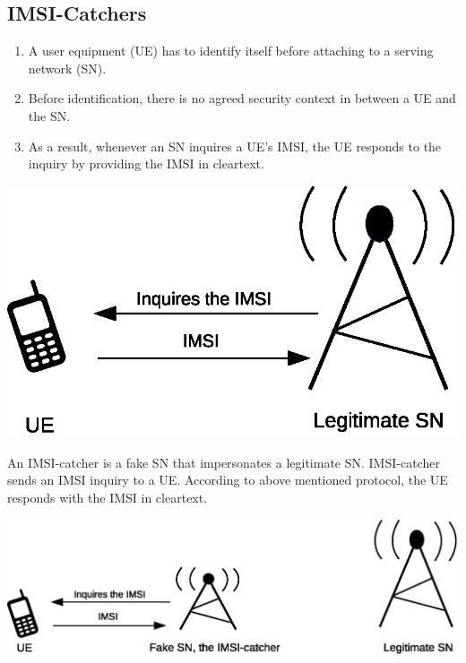 \documentclass[portrait,a0]{a0poster}
\begin{document}
\begin{multicols}{2} %


\section{IMSI-Catchers}
\begin{enumerate}
\item A user equipment (UE) has to identify itself before attaching to a serving network (SN). 
\item Before identification, there is no agreed security context in between a UE and the SN. 
\item As a result, whenever an SN inquires a UE's IMSI, the UE responds to the inquiry by providing the IMSI in cleartext.
\end{enumerate}

\begin{center}
\begin{minipage}[t]{0.9\linewidth} %
\vspace{.5cm} %
\includegraphics[width=.8\linewidth]{IMSI-catcher.eps}
\hspace{0pt}
\vspace{.5cm} %
\end{minipage} 
\end{center}

An IMSI-catcher is a fake SN that impersonates a legitimate SN. IMSI-catcher sends an IMSI inquiry to a UE. According to above mentioned protocol, the UE responds with the IMSI in cleartext.

\begin{center}
\begin{minipage}[t]{0.9\linewidth} %
\vspace{.5cm} %
\includegraphics[width=1\linewidth]{IMSI-catcher1.eps}
\hspace{0pt}
\vspace{.25cm} %
\end{minipage} 
\end{center}



\end{multicols}
\end{document}
